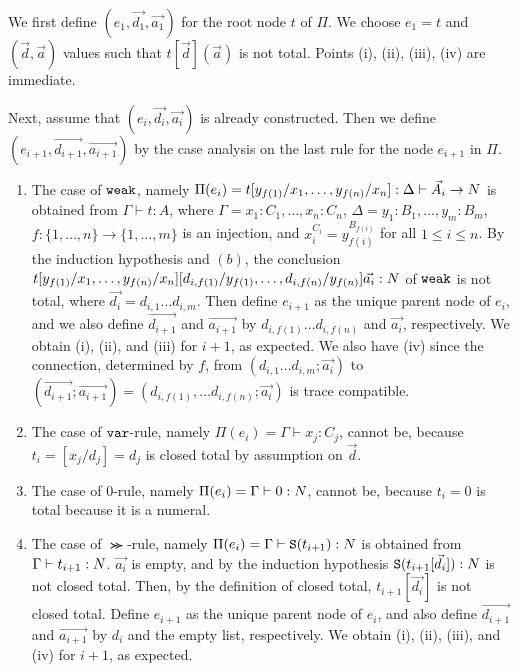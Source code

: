 \documentclass{article}
\newenvironment{proof}[1][Proof]{\begin{trivlist}
\item[\hskip \labelsep {\bfseries #1}]}{\end{trivlist}}
\begin{document}
\begin{proof}
  We first define $(e_1,\vec{d_1},\vec{a_1})$ for the root node $t$ of $\Pi$.
  We choose $e_1 = t$ and $(\vec{d},\vec{a})$ values such that $t[\vec{d}](\vec{a})$ is not total.
  Points (i), (ii), (iii), (iv) are immediate.

  Next, assume that $(e_i,\vec{d_i},\vec{a_i})$ is already constructed.
  Then we define $(e_{i+1},\vec{d_{i+1}},\vec{a_{i+1}})$ by the case analysis on
  the last rule for the node $e_{i+1}$ in $\Pi$. 


\begin{enumerate}
\item
  The case of ${\tt weak}$, namely
  $\Pi(e_i) = t[y_{f(1)}/x_1,\ldots,y_{f(n)}/x_n]:\Delta\vdash \vec{A_i}\rightarrow{N}$
  is obtained from $\Gamma\vdash t:A$, where
  $\Gamma = x_1:C_1,\ldots,x_n:C_n$, $\Delta = y_1:B_1,\ldots,y_m:B_m$, 
  $f:\{1,\ldots,n\}\to\{1,\ldots,m\}$ is an injection, 
  and $x_i^{C_i}=y_{f(i)}^{B_{f(i)}}$ for all $1\le i\le n$.
  By the induction hypothesis and $(b)$, the conclusion
  $t[y_{f(1)}/x_1,\ldots,y_{f(n)}/x_n][d_{i,f(1)}/y_{f(1)},\ldots,d_{i,f(n)}/y_{f(n)}]\vec{a_i}:{N}$ 
  of ${\tt weak}$ is not total, where $\vec{d_i} = d_{i,1}\ldots d_{i,m}$.
  Then define $e_{i+1}$ as the unique parent node of $e_i$, and we
  also define $\vec{d_{i+1}}$ and $\vec{a_{i+1}}$ by $d_{i,f(1)}\ldots d_{i,f(n)}$
  and $\vec{a_i}$, respectively. 
  We obtain (i), (ii), and (iii) for $i+1$, as expected.
  We also have (iv) since the connection, determined by $f$, from
  $(d_{i,1}\ldots d_{i,m};\vec{a_i})$ to 
  $(\vec{d_{i+1}};\vec{a_{i+1}}) = (d_{i,f(1)},\ldots d_{i,f(n)};\vec{a_i})$
  is trace compatible. 

\item
  The case of ${\tt var}$-rule, namely $\Pi(e_i) = \Gamma\vdash x_j:C_j$, 
cannot be, because $t_i = [x_j/d_j] = d_j$ is closed total by assumption on $\vec{d}$.

\item
  The case of $0$-rule, namely $\Pi(e_i) = \Gamma\vdash 0:{N}$, cannot be, because $t_i = 0$ is total
because it is a numeral.

\item  
  The case of $\Succ$-rule, namely $\Pi(e_i) = \Gamma\vdash {\tt S}(t_{i+1}): {N}$ is obtained from
  $\Gamma\vdash t_{i+1}: {N}$. $\vec{a_i}$ is empty, and
  by the induction hypothesis ${\tt S}(t_{i+1}[\vec{d_i}]):{N}$ is not closed total.
  Then, by the definition of closed total, $t_{i+1}[\vec{d_i}]$ is not closed total. 
  Define $e_{i+1}$ as the unique parent node of $e_i$, and
  also define $\vec{d_{i+1}}$ and $\vec{a_{i+1}}$ by $d_i$ and the empty list, respectively. 
  We obtain (i), (ii), (iii), and (iv) for $i+1$, as expected.


\end{enumerate}
\end{proof}
\end{document}
